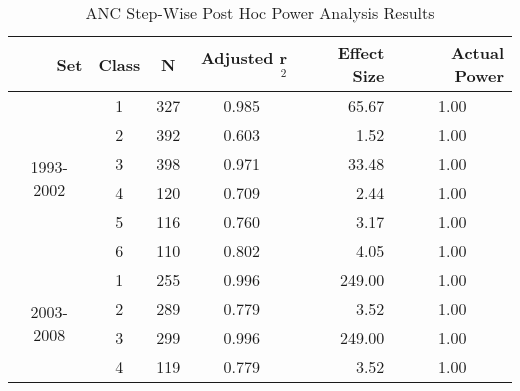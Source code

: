 \begin{table}[htbp]
  \centering
	\caption{ANC Step-Wise Post Hoc Power Analysis Results}
    \begin{tabular}{rrcrrr}
    \toprule
    Set   & Class & N     & Adjusted r$^2$ & Effect Size & Actual Power \\
    \midrule
    \multicolumn{1}{c}{\multirow{6}[1]{*}{\begin{sideways}1993-2002\end{sideways}}} & \multicolumn{1}{c}{1} & \multicolumn{1}{c}{327} & \multicolumn{1}{c}{0.985 } & \multicolumn{1}{r}{65.67 } & \multicolumn{1}{c}{1.00 } \\
    \multicolumn{1}{c}{} & \multicolumn{1}{c}{2} & \multicolumn{1}{c}{392} & \multicolumn{1}{c}{0.603 } & \multicolumn{1}{r}{1.52 } & \multicolumn{1}{c}{1.00 } \\
    \multicolumn{1}{c}{} & \multicolumn{1}{c}{3} & \multicolumn{1}{c}{398} & \multicolumn{1}{c}{0.971 } & \multicolumn{1}{r}{33.48 } & \multicolumn{1}{c}{1.00 } \\
    \multicolumn{1}{c}{} & \multicolumn{1}{c}{4} & \multicolumn{1}{c}{120} & \multicolumn{1}{c}{0.709 } & \multicolumn{1}{r}{2.44 } & \multicolumn{1}{c}{1.00 } \\
    \multicolumn{1}{c}{} & \multicolumn{1}{c}{5} & \multicolumn{1}{c}{116} & \multicolumn{1}{c}{0.760 } & \multicolumn{1}{r}{3.17 } & \multicolumn{1}{c}{1.00 } \\
    \multicolumn{1}{c}{} & \multicolumn{1}{c}{6} & \multicolumn{1}{c}{110} & \multicolumn{1}{c}{0.802} & \multicolumn{1}{r}{4.05 } & \multicolumn{1}{c}{1.00 } \\\midrule
    \multicolumn{1}{c}{\multirow{6}[2]{*}{\begin{sideways}2003-2008\end{sideways}}} & \multicolumn{1}{c}{1} & \multicolumn{1}{c}{255} & \multicolumn{1}{c}{0.996 } & \multicolumn{1}{r}{249.00 } & \multicolumn{1}{c}{1.00 } \\
    \multicolumn{1}{c}{} & \multicolumn{1}{c}{2} & \multicolumn{1}{c}{289} & \multicolumn{1}{c}{0.779 } & \multicolumn{1}{r}{3.52 } & \multicolumn{1}{c}{1.00 } \\
    \multicolumn{1}{c}{} & \multicolumn{1}{c}{3} & \multicolumn{1}{c}{299} & \multicolumn{1}{c}{0.996 } & \multicolumn{1}{r}{249.00 } & \multicolumn{1}{c}{1.00 } \\
    \multicolumn{1}{c}{} & \multicolumn{1}{c}{4} & \multicolumn{1}{c}{119} & \multicolumn{1}{c}{0.779 } & \multicolumn{1}{r}{3.52 } & \multicolumn{1}{c}{1.00 } \\

\end{tabular}
\end{table}
